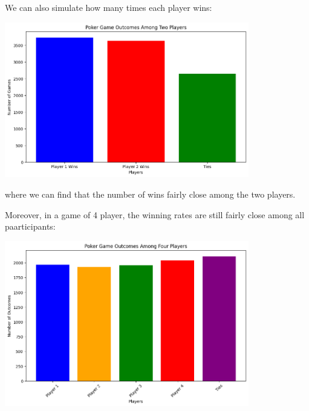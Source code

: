 \documentclass{article}
\begin{document}
We can also simulate how many times each player wins:

\begin{center}
    \includegraphics[width = 0.8\textwidth]{images/win_rate_2_player.png}
\end{center}

where we can find that the number of wins fairly close among the 
two players.

Moreover, in a game of 4 player, the winning rates are still fairly close 
among all paarticipants:

\begin{center}
    \includegraphics[width = 0.8\textwidth]{images/win_rate_4_player.png}
\end{center}
\end{document}

